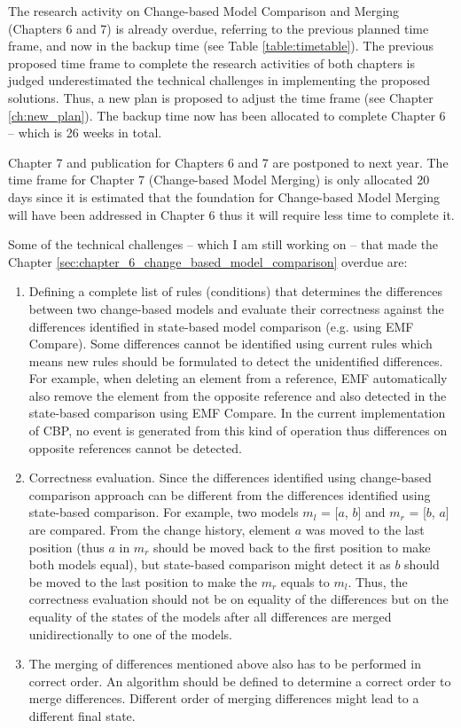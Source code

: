 \documentclass[12pt, a4paper]{report} \usepackage[titletoc]{appendix}
\begin{document}
The research activity on Change-based Model Comparison and Merging (Chapters 6 and 7) is already overdue, referring to the previous planned time frame, and now in the backup time (see Table \ref{table:timetable}). The previous proposed time frame to complete the research activities of both chapters is judged underestimated the technical challenges in implementing the proposed solutions. Thus, a new plan is proposed to adjust the time frame (see Chapter \ref{ch:new_plan}). The backup time now has been allocated to complete Chapter 6 -- which is 26 weeks in total. 

Chapter 7 and publication for Chapters 6 and 7 are postponed to next year. The time frame for Chapter 7 (Change-based Model Merging) is only allocated 20 days since it is estimated that the foundation for Change-based Model Merging will have been addressed in Chapter 6  thus it will require less time to complete it.

Some of the technical challenges -- which I am still working on -- that made the Chapter \ref{sec:chapter_6_change_based_model_comparison} overdue are:

\begin{enumerate}
    \item  
    Defining a complete list of rules (conditions) that determines the differences between two change-based models and evaluate their correctness against the differences identified in state-based model comparison (e.g. using EMF Compare). Some differences cannot be identified using current rules which means new rules should be formulated to detect the unidentified differences. For example, when deleting an element from a reference, EMF automatically also remove the element from the opposite reference and also detected in the state-based comparison using EMF Compare. In the current implementation of CBP, no event is generated from this kind of operation thus differences on opposite references cannot be detected. 
    \item  
    Correctness evaluation. Since the differences identified using change-based comparison approach can be different  from the differences identified using state-based comparison. For example, two models $m_l$ = [$a$, $b$] and $m_r$ = [$b$, $a$] are compared. From the change history, element $a$ was moved to the last position (thus $a$ in $m_r$ should be moved back to the first position to make both models equal), but state-based comparison might detect it as $b$ should be moved to the last position to make the $m_r$ equals to $m_l$. Thus, the correctness evaluation should not be on equality of the differences but on the equality of the states of the models after all differences are merged unidirectionally to one of the models. 
    \item 
    The merging of differences mentioned above also has to be performed in correct order. An algorithm should be defined to determine a correct order to merge differences. Different order of merging differences might lead to a different final state.
\end{enumerate}
\end{document}
